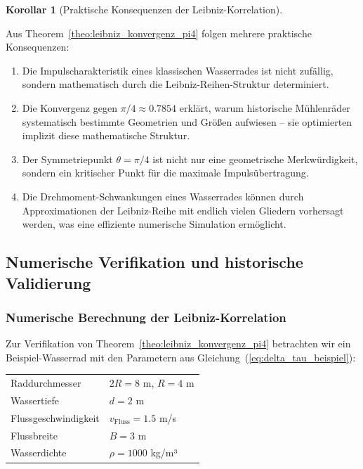 \documentclass[a4paper,12pt]{article}
\theoremstyle{definition}
\newtheorem{corollary}{Korollar}
\begin{document}
\begin{corollary}[Praktische Konsequenzen der Leibniz-Korrelation]
  \label{cor:praktische_konsequenzen}
  
  Aus Theorem~\ref{theo:leibniz_konvergenz_pi4} folgen mehrere praktische Konsequenzen:
  
  \begin{enumerate}
    \item Die Impulscharakteristik eines klassischen Wasserrades ist nicht zufällig, sondern mathematisch durch die Leibniz-Reihen-Struktur determiniert.
    
    \item Die Konvergenz gegen $\pi/4 \approx 0.7854$ erklärt, warum historische Mühlenräder systematisch bestimmte Geometrien und Größen aufwiesen -- sie optimierten implizit diese mathematische Struktur.
    
    \item Der Symmetriepunkt $\theta = \pi/4$ ist nicht nur eine geometrische Merkwürdigkeit, sondern ein kritischer Punkt für die maximale Impulsübertragung.
    
    \item Die Drehmoment-Schwankungen eines Wasserrades können durch Approximationen der Leibniz-Reihe mit endlich vielen Gliedern vorhersagt werden, was eine effiziente numerische Simulation ermöglicht.
  \end{enumerate}
\end{corollary}

\subsection{Numerische Verifikation und historische Validierung}

\subsubsection{Numerische Berechnung der Leibniz-Korrelation}

Zur Verifikation von Theorem~\ref{theo:leibniz_konvergenz_pi4} betrachten wir ein Beispiel-Wasserrad mit den Parametern aus Gleichung~(\ref{eq:delta_tau_beispiel}):

\begin{tabular}{ll}
  Raddurchmesser & $2R = 8$ m, $R = 4$ m \\
  Wassertiefe & $d = 2$ m \\
  Flussgeschwindigkeit & $v_{\text{Fluss}} = 1.5$ m/s \\
  Flussbreite & $B = 3$ m \\
  Wasserdichte & $\rho = 1000$ kg/m³
\end{tabular}
\end{document}
